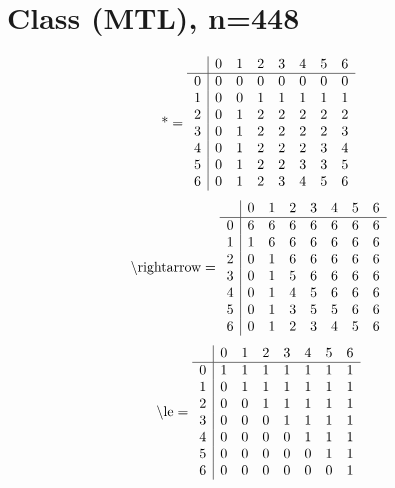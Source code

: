 \documentclass[11pt]{article}
\begin{document}
\section{Class (MTL), n=448}
\[\text{*} = 
\begin{array}{r | r r r r r r r}
 & 0 & 1 & 2 & 3 & 4 & 5 & 6 \\ \hline
0 & 0 & 0 & 0 & 0 & 0 & 0 & 0 \\
1 & 0 & 0 & 1 & 1 & 1 & 1 & 1 \\
2 & 0 & 1 & 2 & 2 & 2 & 2 & 2 \\
3 & 0 & 1 & 2 & 2 & 2 & 2 & 3 \\
4 & 0 & 1 & 2 & 2 & 2 & 3 & 4 \\
5 & 0 & 1 & 2 & 2 & 3 & 3 & 5 \\
6 & 0 & 1 & 2 & 3 & 4 & 5 & 6 \\
\end{array}
\]
\[\text{\textbackslash rightarrow} = 
\begin{array}{r | r r r r r r r}
 & 0 & 1 & 2 & 3 & 4 & 5 & 6 \\ \hline
0 & 6 & 6 & 6 & 6 & 6 & 6 & 6 \\
1 & 1 & 6 & 6 & 6 & 6 & 6 & 6 \\
2 & 0 & 1 & 6 & 6 & 6 & 6 & 6 \\
3 & 0 & 1 & 5 & 6 & 6 & 6 & 6 \\
4 & 0 & 1 & 4 & 5 & 6 & 6 & 6 \\
5 & 0 & 1 & 3 & 5 & 5 & 6 & 6 \\
6 & 0 & 1 & 2 & 3 & 4 & 5 & 6 \\
\end{array}
\]
\[\text{\textbackslash le} = 
\begin{array}{r | r r r r r r r}
 & 0 & 1 & 2 & 3 & 4 & 5 & 6 \\ \hline
0 & 1 & 1 & 1 & 1 & 1 & 1 & 1 \\
1 & 0 & 1 & 1 & 1 & 1 & 1 & 1 \\
2 & 0 & 0 & 1 & 1 & 1 & 1 & 1 \\
3 & 0 & 0 & 0 & 1 & 1 & 1 & 1 \\
4 & 0 & 0 & 0 & 0 & 1 & 1 & 1 \\
5 & 0 & 0 & 0 & 0 & 0 & 1 & 1 \\
6 & 0 & 0 & 0 & 0 & 0 & 0 & 1 \\
\end{array}
\]
\end{document}
